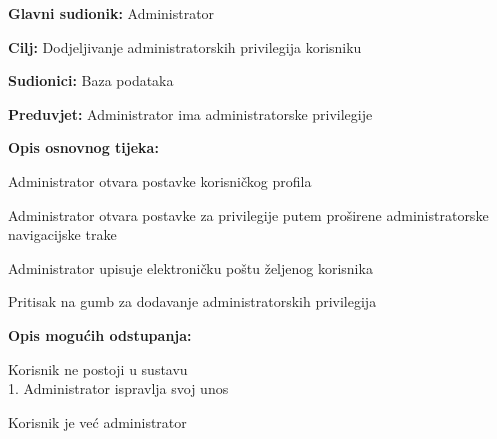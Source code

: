 					
					\noindent {}
					\begin{packed_item}
						\item \textbf{Glavni sudionik:} Administrator
						\item \textbf{Cilj:} Dodjeljivanje administratorskih privilegija korisniku
						\item \textbf{Sudionici:} Baza podataka
						\item \textbf{Preduvjet:} Administrator ima administratorske privilegije
						\item \textbf{Opis osnovnog tijeka:}
						\begin{packed_enum}
							\item Administrator otvara postavke korisničkog profila
							\item Administrator otvara postavke za privilegije putem proširene administratorske navigacijske trake
							\item Administrator upisuje elektroničku poštu željenog korisnika 
							\item Pritisak na gumb za dodavanje administratorskih privilegija
						\end{packed_enum}
						\item \textbf{Opis mogućih odstupanja:}
						\begin{packed_item}
							\item [3.a] Korisnik ne postoji u sustavu
							\\1. Administrator ispravlja svoj unos
							\item [4.a] Korisnik je već administrator
						\end{packed_item}
					\end{packed_item}

